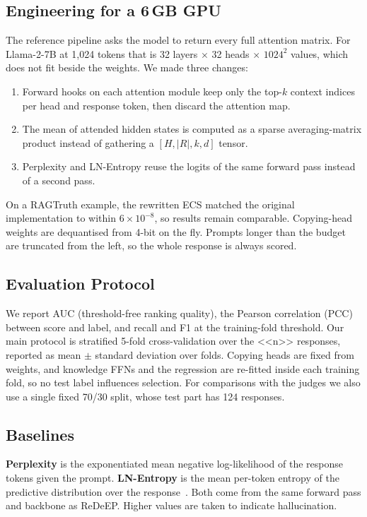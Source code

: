 \documentclass[conference]{IEEEtran}
\begin{document}
\subsection{Engineering for a 6\,GB GPU}
The reference pipeline asks the model to return every full attention matrix. For Llama-2-7B at 1{,}024 tokens that is 32 layers $\times$ 32 heads $\times$ $1024^2$ values, which does not fit beside the weights. We made three changes:
\begin{enumerate}
\item Forward hooks on each attention module keep only the top-$k$ context indices per head and response token, then discard the attention map.
\item The mean of attended hidden states is computed as a sparse averaging-matrix product instead of gathering a $[H, |R|, k, d]$ tensor.
\item Perplexity and LN-Entropy reuse the logits of the same forward pass instead of a second pass.
\end{enumerate}
On a RAGTruth example, the rewritten ECS matched the original implementation to within $6\times10^{-8}$, so results remain comparable. Copying-head weights are dequantised from 4-bit on the fly. Prompts longer than the budget are truncated from the left, so the whole response is always scored.

\subsection{Evaluation Protocol}
We report AUC (threshold-free ranking quality), the Pearson correlation (PCC) between score and label, and recall and F1 at the training-fold threshold. Our main protocol is stratified 5-fold cross-validation over the <<n>> responses, reported as mean $\pm$ standard deviation over folds. Copying heads are fixed from weights, and knowledge FFNs and the regression are re-fitted inside each training fold, so no test label influences selection. For comparisons with the judges we also use a single fixed 70/30 split, whose test part has 124 responses.

\subsection{Baselines}
\textbf{Perplexity} is the exponentiated mean negative log-likelihood of the response tokens given the prompt. \textbf{LN-Entropy} is the mean per-token entropy of the predictive distribution over the response~\cite{malinin2021uncertainty}. Both come from the same forward pass and backbone as ReDeEP. Higher values are taken to indicate hallucination.
\end{document}
